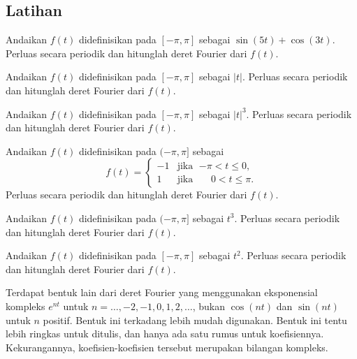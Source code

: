 \subsection{Latihan}

\begin{exercise}
Andaikan $f(t)$ didefinisikan pada $[-\pi,\pi]$ sebagai $\sin (5t) + \cos (3t)$.  Perluas
secara periodik dan hitunglah deret Fourier dari $f(t)$.
\end{exercise}

\begin{exercise}
Andaikan $f(t)$ didefinisikan pada $[-\pi,\pi]$ sebagai $\lvert t \rvert$.
Perluas secara periodik dan hitunglah deret Fourier dari $f(t)$.
\end{exercise}

\begin{exercise}
Andaikan $f(t)$ didefinisikan pada $[-\pi,\pi]$ sebagai $\lvert t \rvert^3$.
Perluas secara periodik dan hitunglah deret Fourier dari $f(t)$.
\end{exercise}

\begin{exercise}
Andaikan $f(t)$ didefinisikan pada $(-\pi,\pi]$ sebagai
\begin{equation*}
f(t) =
\begin{cases}
-1 & \text{jika } \; {-\pi} < t \leq 0 , \\
1 & \text{jika } \; \phantom{-}0 < t \leq \pi .
\end{cases}
\end{equation*}
Perluas secara periodik dan hitunglah deret Fourier dari $f(t)$.
\end{exercise}

\begin{exercise}
Andaikan $f(t)$ didefinisikan pada $(-\pi,\pi]$ sebagai $t^3$.
Perluas secara periodik dan hitunglah deret Fourier dari $f(t)$.
\end{exercise}

\begin{exercise}
Andaikan $f(t)$ didefinisikan pada $[-\pi,\pi]$ sebagai $t^2$.
Perluas secara periodik dan hitunglah deret Fourier dari $f(t)$.
\end{exercise}

Terdapat bentuk lain dari deret Fourier yang menggunakan eksponensial kompleks
$e^{nt}$ untuk $n=\ldots,-2,-1,0,1,2,\ldots$, bukan
$\cos(nt)$ dan $\sin(nt)$ untuk $n$ positif.  Bentuk ini terkadang lebih mudah
digunakan.  Bentuk ini tentu lebih ringkas untuk ditulis,
dan hanya ada satu rumus untuk koefisiennya.  Kekurangannya,
koefisien-koefisien tersebut merupakan bilangan kompleks.

